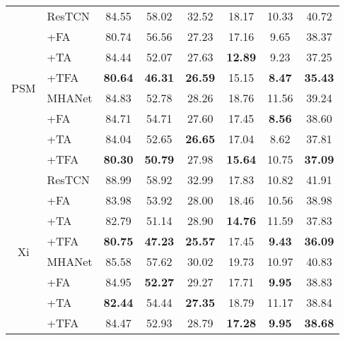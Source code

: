 \begin{table}[!hbtp]
\begin{tabular}{@{}cl||cccccc@{}}
        \multirow{8}{*}{PSM}
        & ResTCN & 84.55 & 58.02 & 32.52 & 18.17 & 10.33 & 40.72\\
        & +FA & 80.74 & 56.56 & 27.23 & 17.16 & 9.65 & 38.37\\
        & +TA & 84.44 & 52.07 & 27.63 & \textbf{12.89} & 9.23 & 37.25\\
        & +TFA & \textbf{80.64} & \textbf{46.31} & \textbf{26.59} & 15.15 & \textbf{8.47} & \textbf{35.43}\\
        \cline{2-8}
        & MHANet & 84.83 & 52.78 & 28.26 & 18.76 & 11.56 & 39.24\\
        & +FA & 84.71 & 54.71 & 27.60 & 17.45 & \textbf{8.56 }& 38.60\\
        & +TA & 84.04 & 52.65 & \textbf{26.65} & 17.04 & 8.62 & 37.81\\
        & +TFA & \textbf{80.30} & \textbf{50.79} & 27.98 & \textbf{15.64} & 10.75 & \textbf{37.09}\\
        \hline
        \hline
        
        \multirow{8}{*}{Xi}
        & ResTCN & 88.99 & 58.92 & 32.99 & 17.83 & 10.82 & 41.91\\
        & +FA & 83.98 & 53.92 & 28.00 & 18.46 & 10.56 & 38.98\\
        & +TA & 82.79 & 51.14 & 28.90 & \textbf{14.76} & 11.59 & 37.83\\
        & +TFA & \textbf{80.75} & \textbf{47.23} & \textbf{25.57} & 17.45 & \textbf{9.43} & \textbf{36.09}\\
        \cline{2-8}
        & MHANet & 85.58 & 57.62 & 30.02 & 19.73 & 10.97 & 40.83\\
        & +FA & 84.95 & \textbf{52.27} & 29.27 & 17.71 & \textbf{9.95} & 38.83\\
        & +TA & \textbf{82.44} & 54.44 & \textbf{27.35} & 18.79 & 11.17 & 38.84\\
        & +TFA & 84.47 & 52.93 & 28.79 & \textbf{17.28} & \textbf{9.95} & \textbf{38.68}\\
        \hline
        
\end{tabular}
\label{tab:wer}
\vspace{-1.5em}
\end{table}